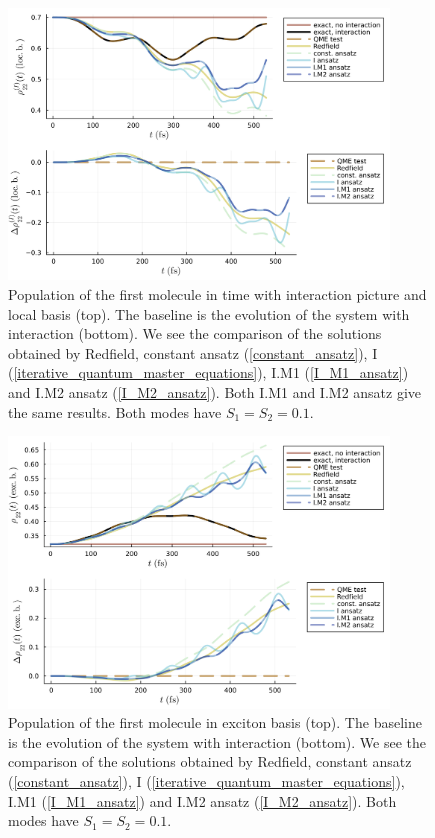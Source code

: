 \newpage
\begin{figure}[H]
\centering
\includegraphics[width=0.9\textwidth]{img/ansatz/iterative01_I_joined_intloc22.png}
\caption{Population of the first molecule in time with interaction picture and local basis (top). The baseline is the evolution of the system with interaction (bottom). We see the comparison of the solutions obtained by Redfield, constant ansatz (\ref{constant_ansatz}), I (\ref{iterative_quantum_master_equations}), I.M1 (\ref{I_M1_ansatz}) and I.M2 ansatz (\ref{I_M2_ansatz}). Both I.M1 and I.M2 ansatz give the same results. Both modes have $S_1=S_2=0.1$.}
\label{img:iterative01_I_joined_intloc22}
\end{figure}

\begin{figure}[H]
\centering
\includegraphics[width=0.9\textwidth]{img/ansatz/iterative01_I_joined_schexc22.png}
\caption{Population of the first molecule in exciton basis (top). The baseline is the evolution of the system with interaction (bottom). We see the comparison of the solutions obtained by Redfield, constant ansatz (\ref{constant_ansatz}), I (\ref{iterative_quantum_master_equations}), I.M1 (\ref{I_M1_ansatz}) and I.M2 ansatz (\ref{I_M2_ansatz}). Both modes have $S_1=S_2=0.1$.}
\label{img:iterative01_I_joined_schexc22}
\end{figure}

